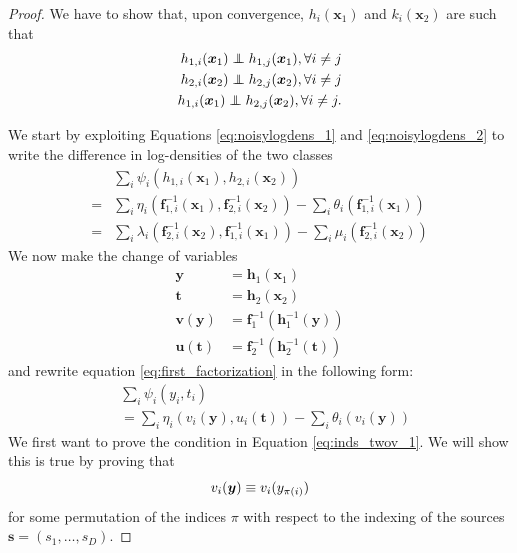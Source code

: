 \documentclass[letterpaper]{article}
\newcommand\independent{\protect\mathpalette{\protect\independenT}{\perp}}
\def\independenT#1#2{\mathrel{\rlap{$#1#2$}\mkern2mu{#1#2}}}
\theoremstyle{definition}
\begin{document}
\begin{proof}
We have to
show that, upon convergence, $h_{i}(\bm{x}_{1})$ and $k_{i}(\bm{x}_{2})$
are such that
\begin{align}
h_{1,i}(\bm{x}_{1})\independent h_{1,j}(\bm{x}_{1}),\forall i\neq j \label{eq:inds_twov_1} \\
h_{2,i}(\bm{x}_{2})\independent h_{2,j}(\bm{x}_{2}),\forall i\neq j \label{eq:inds_twov_2}\\
h_{1,i}(\bm{x}_{1})\independent h_{2,j}(\bm{x}_{2}),\forall i\neq j. \label{eq:inds_twov_3}
    \end{align}

We start by exploiting Equations \ref{eq:noisylogdens_1} and \ref{eq:noisylogdens_2} to write the difference in log-densities of the two classes
\begin{align}
&\sum_{i}\psi_{i}(h_{1,i}(\bm{x}_{1}),h_{2,i}(\bm{x}_{2}))\nonumber\\
=&\sum_{i}\eta_{i}(\bm{f}_{1,i}^{-1}(\bm{x}_{1}), \bm{f}_{2,i}^{-1}(\bm{x}_{2})) - \sum_{i}\theta_{i}(\bm{f}_{1,i}^{-1}(\bm{x}_{1})) \label{eq:first_factorization}\\
=&\sum_{i}\lambda_{i}(\bm{f}_{2,i}^{-1}(\bm{x}_{2}), \bm{f}_{1,i}^{-1}(\bm{x}_{1})) - \sum_{i}\mu_{i}(\bm{f}_{2,i}^{-1}(\bm{x}_{2}))\label{eq:2nd_factorization}
\end{align}
We now make the change of variables
\begin{align*}
\bm{y} & =\bm{h}_1(\bm{x}_{1})\\
\bm{t} & =\bm{h}_2(\bm{x}_{2})\\
\bm{v}(\bm{y}) & =\bm{f}_{1}^{-1}(\bm{h}_1^{-1}(\bm{y}))\\
\bm{u}(\bm{t}) & =\bm{f}_{2}^{-1}(\bm{h}_2^{-1}(\bm{t}))
\end{align*}
and rewrite equation \ref{eq:first_factorization} in the following form:
\begin{align}
&\sum_{i}\psi_{i}(y_{i},t_{i}) \nonumber \\
&=\sum_{i}\eta_{i}(v_i(\bm{y}), u_i(\bm{t}))
-\sum_{i}\theta_{i}(v_i(\bm{y}))\label{eq:logistic}
\end{align}
We first want to prove the condition in Equation \ref{eq:inds_twov_1}.
We will show this is true by proving that
\begin{equation}
\label{eq:v_onev}
v_{i}(\bm{y})  \equiv v_{i}(y_{\pi(i)})\\
\end{equation}
for some permutation of the indices $\pi$ with respect to the indexing of the sources $\bm{s} = (s_1, \ldots, s_D)$.


\end{proof}
\end{document}

